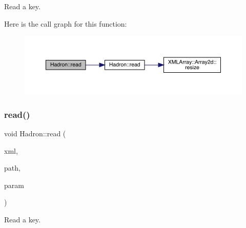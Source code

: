 Read a key. 

Here is the call graph for this function\+:\nopagebreak
\begin{figure}[H]
\begin{center}
\leavevmode
\includegraphics[width=350pt]{d1/daf/namespaceHadron_adde6149254919751c9f0e1b2b12c4d17_cgraph}
\end{center}
\end{figure}
\mbox{\label{namespaceHadron_a61520b9a5ce2b207d1c01e1508a5c470}} 
\subsubsection{\texorpdfstring{read()}{read()}\hspace{0.1cm}{\footnotesize\ttfamily [23/94]}}
{\footnotesize\ttfamily void Hadron\+::read (\begin{DoxyParamCaption}\item[{\mbox{\hyperlink{classADATXML_1_1XMLReader}{X\+M\+L\+Reader}} \&}]{xml,  }\item[{const std\+::string \&}]{path,  }\item[{\mbox{\hyperlink{structHadron_1_1KeyBaryonElementalOperator__t}{Key\+Baryon\+Elemental\+Operator\+\_\+t}} \&}]{param }\end{DoxyParamCaption})}



Read a key. 

